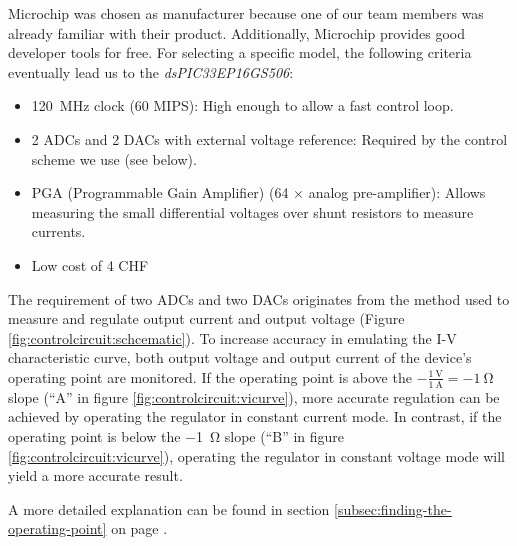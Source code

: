 Microchip  was chosen  as manufacturer  because one  of our  team members  was
already familiar  with their  product.  Additionally, Microchip  provides good
developer  tools  for free. For  selecting  a  specific model,  the  following
criteria eventually lead us to the \emph{dsPIC33EP16GS506}:

\begin{itemize}
    \item
        \SI{120}{\mega\hertz}  clock (60  MIPS): High enough  to allow  a fast
        control loop.
    \item
        2 ADCs  and 2  DACs with external  voltage reference: Required  by the
        control  scheme  we use (see below).
    \item
        PGA    (Programmable    Gain    Amplifier)   (64    $\times$    analog
        pre-amplifier): Allows measuring the small differential voltages over
        shunt resistors to measure currents.
    \item
        Low cost of 4 CHF
\end{itemize}

The  requirement  of  two  ADCs  and  two  DACs  originates  from  the  method
used  to  measure and  regulate  output  current  and output  voltage  (Figure
\ref{fig:controlcircuit:schcematic}).  To  increase accuracy in  emulating the
I-V  characteristic curve,  both  output  voltage and  output  current of  the
device's  operating point  are monitored.   If  the operating  point is  above
the $-\frac{\SI{1}{\volt}}{\SI{1}{\ampere}}  = \SI{-1}{\ohm}$ slope  (``A'' in
figure  \ref{fig:controlcircuit:vicurve}),  more  accurate regulation  can  be
achieved by operating the regulator in constant current mode.  In contrast, if
the  operating  point  is  below  the \SI{-1}{\ohm}  slope  (``B''  in  figure
\ref{fig:controlcircuit:vicurve}), operating the regulator in constant voltage
mode will yield a more accurate result.

A       more        detailed       explanation       can        be       found
in      section      \ref{subsec:finding-the-operating-point}     on      page
\pageref{subsec:finding-the-operating-point}.


